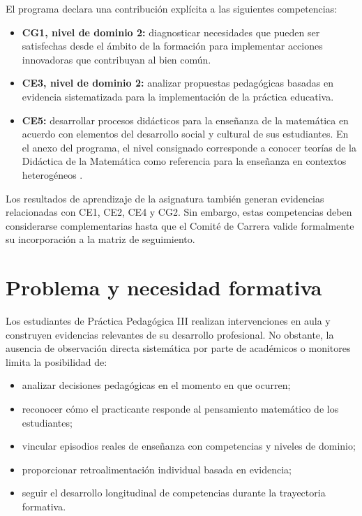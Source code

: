 \documentclass[11pt,a4paper]{article}
\begin{document}
El programa declara una contribución explícita a las siguientes competencias:

\begin{itemize}
    \item \textbf{CG1, nivel de dominio 2:} diagnosticar necesidades que pueden ser satisfechas desde el ámbito de la formación para implementar acciones innovadoras que contribuyan al bien común.
    \item \textbf{CE3, nivel de dominio 2:} analizar propuestas pedagógicas basadas en evidencia sistematizada para la implementación de la práctica educativa.
    \item \textbf{CE5:} desarrollar procesos didácticos para la enseñanza de la matemática en acuerdo con elementos del desarrollo social y cultural de sus estudiantes. En el anexo del programa, el nivel consignado corresponde a conocer teorías de la Didáctica de la Matemática como referencia para la enseñanza en contextos heterogéneos \cite{practicaIII,competencias}.
\end{itemize}

Los resultados de aprendizaje de la asignatura también generan evidencias relacionadas con CE1, CE2, CE4 y CG2. Sin embargo, estas competencias deben considerarse complementarias hasta que el Comité de Carrera valide formalmente su incorporación a la matriz de seguimiento.

\section{Problema y necesidad formativa}

Los estudiantes de Práctica Pedagógica III realizan intervenciones en aula y construyen evidencias relevantes de su desarrollo profesional. No obstante, la ausencia de observación directa sistemática por parte de académicos o monitores limita la posibilidad de:

\begin{itemize}
    \item analizar decisiones pedagógicas en el momento en que ocurren;
    \item reconocer cómo el practicante responde al pensamiento matemático de los estudiantes;
    \item vincular episodios reales de enseñanza con competencias y niveles de dominio;
    \item proporcionar retroalimentación individual basada en evidencia;
    \item seguir el desarrollo longitudinal de competencias durante la trayectoria formativa.
\end{itemize}
\end{document}
